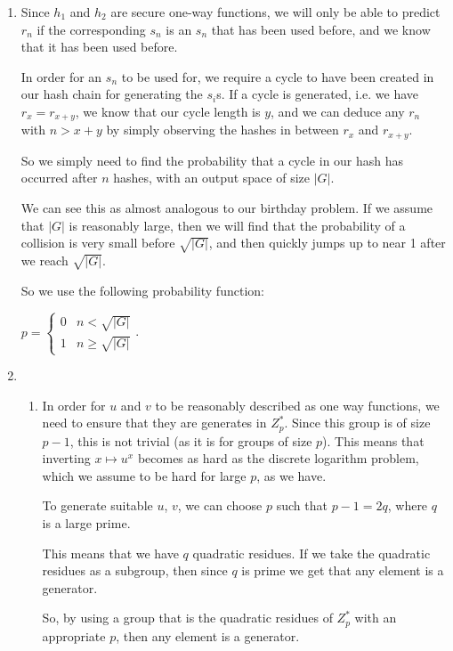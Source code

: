 


\begin{enumerate}[label=(\alph*)]
  \item
    Since $h_1$ and $h_2$ are secure one-way functions, we will only be able to predict $r_n$ if the corresponding $s_n$ is an $s_n$ that has been used before, and we know that it has been used before.

    In order for an $s_n$ to be used for, we require a cycle to have been created in our hash chain for generating the $s_i$s. If a cycle is generated, i.e. we have $r_x = r_{x + y}$, we know that our cycle length is $y$, and we can deduce any $r_n$ with $n > x+y$ by simply observing the hashes in between $r_x$ and $r_{x+y}$.

    So we simply need to find the probability that a cycle in our hash has occurred after $n$ hashes, with an output space of size $|G|$.

    We can see this as almost analogous to our birthday problem. If we assume that $|G|$ is reasonably large, then we will find that the probability of a collision is very small before $\sqrt{|G|}$, and then quickly jumps up to near 1 after we reach $\sqrt{|G|}$.

    So we use the following probability function:

    $p = \begin{cases}0 & n < \sqrt{|G|}\\1 & n \geq \sqrt{|G|}\end{cases}$.

  \item
    \begin{enumerate}[label=(\roman*)]
      \item
        In order for $u$ and $v$ to be reasonably described as one way functions, we need to ensure that they are generates in $Z^*_p$. Since this group is of size $p-1$, this is not trivial (as it is for groups of size $p$). This means that inverting $x \mapsto u^x$ becomes as hard as the discrete logarithm problem, which we assume to be hard for large $p$, as we have.

        To generate suitable $u$, $v$, we can choose $p$ such that $p-1 = 2q$, where $q$ is a large prime.

        This means that we have $q$ quadratic residues. If we take the quadratic residues as a subgroup, then since $q$ is prime we get that any element is a generator.

        So, by using a group that is the quadratic residues of $Z^*_{p}$ with an appropriate $p$, then any element is a generator.


\end{enumerate}
\end{enumerate}
